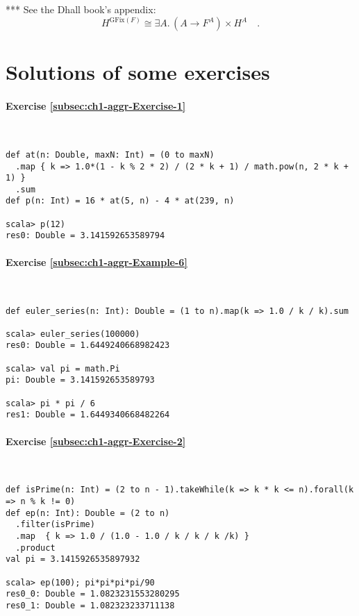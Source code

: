 {*}{*}{*} See the Dhall book\textsf{'}s appendix:
\[
H^{\text{GFix}(F)}\cong\exists A.\,(A\rightarrow F^{A})\times H^{A}\quad.
\]


\chapter{Solutions of some exercises}


\subsubsection*{Exercise \ref{subsec:ch1-aggr-Exercise-1}}

~
\begin{lstlisting}
def at(n: Double, maxN: Int) = (0 to maxN)
  .map { k => 1.0*(1 - k % 2 * 2) / (2 * k + 1) / math.pow(n, 2 * k + 1) }
  .sum
def p(n: Int) = 16 * at(5, n) - 4 * at(239, n)

scala> p(12)
res0: Double = 3.141592653589794
\end{lstlisting}


\subsubsection*{Exercise \ref{subsec:ch1-aggr-Example-6}}

~

\begin{lstlisting}
def euler_series(n: Int): Double = (1 to n).map(k => 1.0 / k / k).sum

scala> euler_series(100000)
res0: Double = 1.6449240668982423

scala> val pi = math.Pi
pi: Double = 3.141592653589793

scala> pi * pi / 6
res1: Double = 1.6449340668482264 
\end{lstlisting}


\subsubsection*{Exercise \ref{subsec:ch1-aggr-Exercise-2}}

~
\begin{lstlisting}
def isPrime(n: Int) = (2 to n - 1).takeWhile(k => k * k <= n).forall(k => n % k != 0)
def ep(n: Int): Double = (2 to n)
  .filter(isPrime)
  .map  { k => 1.0 / (1.0 - 1.0 / k / k / k /k) }
  .product
val pi = 3.1415926535897932

scala> ep(100); pi*pi*pi*pi/90
res0_0: Double = 1.0823231553280295
res0_1: Double = 1.082323233711138 
\end{lstlisting}


